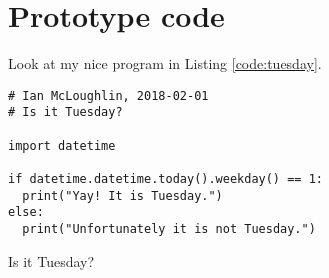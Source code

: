 \chapter{Prototype code}
Look at my nice program in Listing \ref{code:tuesday}.

\begin{listing}[ht]
  \begin{verbatim}
# Ian McLoughlin, 2018-02-01
# Is it Tuesday?

import datetime

if datetime.datetime.today().weekday() == 1:
  print("Yay! It is Tuesday.")
else:
  print("Unfortunately it is not Tuesday.")
  \end{verbatim}
  \caption{Is it Tuesday?}
  \label{code:tuesday}
\end{listing}
